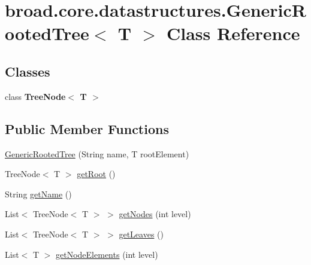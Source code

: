 \hypertarget{classbroad_1_1core_1_1datastructures_1_1_generic_rooted_tree_3_01_t_01_4}{\section{broad.\+core.\+datastructures.\+Generic\+Rooted\+Tree$<$ T $>$ Class Reference}
\label{classbroad_1_1core_1_1datastructures_1_1_generic_rooted_tree_3_01_t_01_4}
}
\subsection*{Classes}
\begin{DoxyCompactItemize}
\item 
class {\bfseries Tree\+Node$<$ T $>$}
\end{DoxyCompactItemize}
\subsection*{Public Member Functions}
\begin{DoxyCompactItemize}
\item 
\hyperlink{classbroad_1_1core_1_1datastructures_1_1_generic_rooted_tree_3_01_t_01_4_a28e41e478bbd1260bb2f5c962186f01d}{Generic\+Rooted\+Tree} (String name, T root\+Element)
\item 
Tree\+Node$<$ T $>$ \hyperlink{classbroad_1_1core_1_1datastructures_1_1_generic_rooted_tree_3_01_t_01_4_a6d1bc149b8ededfc36567a254cdcd892}{get\+Root} ()
\item 
String \hyperlink{classbroad_1_1core_1_1datastructures_1_1_generic_rooted_tree_3_01_t_01_4_a56e6fc08eb824371e30273589d9280ad}{get\+Name} ()
\item 
List$<$ Tree\+Node$<$ T $>$ $>$ \hyperlink{classbroad_1_1core_1_1datastructures_1_1_generic_rooted_tree_3_01_t_01_4_a108d8b6e982aa44309a0c98d52d55a47}{get\+Nodes} (int level)
\item 
List$<$ Tree\+Node$<$ T $>$ $>$ \hyperlink{classbroad_1_1core_1_1datastructures_1_1_generic_rooted_tree_3_01_t_01_4_afa523dabb98b86d540c8031b537b6096}{get\+Leaves} ()
\item 
List$<$ T $>$ \hyperlink{classbroad_1_1core_1_1datastructures_1_1_generic_rooted_tree_3_01_t_01_4_ade1222f912c50f83e1870676bf3b8a80}{get\+Node\+Elements} (int level)
\end{DoxyCompactItemize}


